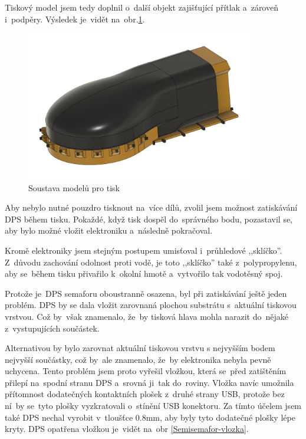 Tiskový model jsem tedy doplnil o~další objekt zajišťující přítlak a~zároveň i~podpěry.
Výsledek je~vidět na~obr.\ref{Semisemafor-box-pritlak}.

\begin{figure}[!h]
  \centering
  \includegraphics[width=0.9\textwidth]{text/PraktickaCast/img/Semisemafor-BOX-pritlak.png}
  \caption{Soustava modelů pro tisk}
  \label{Semisemafor-box-pritlak}
\end{figure}

Aby nebylo nutné pouzdro tisknout na~více dílů, zvolil jsem možnost zatiskávání DPS během tisku.
Pokaždé, když tisk dospěl do~správného bodu, pozastavil se, aby bylo možné vložit elektroniku a~následně pokračoval.

Kromě elektroniky jsem stejným postupem umisťoval i~průhledové ,,sklíčko''.
Z~důvodu zachování odolnost proti vodě, je toto ,,sklíčko'' také z~polypropylenu, aby se~během tisku přivařilo k~okolní hmotě a~vytvořilo tak vodotěsný spoj.

Protože je~DPS semaforu oboustranně osazena, byl při zatiskávání ještě jeden problém.
DPS by se dala vložit zarovnaná plochou substrátu s~aktuální tiskovou vrstvou.
Což by~však znamenalo, že~by tisková hlava mohla narazit do~nějaké z~vystupujících součástek.

Alternativou by bylo zarovnat aktuální tiskovou vrstvu s nejvyšším bodem nejvyšší součástky, což by~ale znamenalo, že~by elektronika nebyla pevně uchycena.
Tento problém jsem proto vyřešil vložkou, která se~před zatištěním přilepí na~spodní stranu DPS a~srovná ji~tak do~roviny.
Vložka navíc umožnila přítomnost dodatečných kontaktních plošek z~druhé strany USB, protože bez ní~by se~tyto plošky vyzkratovali o~stínění USB konektoru.
Za tímto účelem jsem také DPS nechal vyrobit v~tloušťce 0.8mm, aby byly tyto dodatečné plošky lépe kryty. 
DPS opatřena vložkou je~vidět na~obr \ref{Semisemafor-vlozka}.

